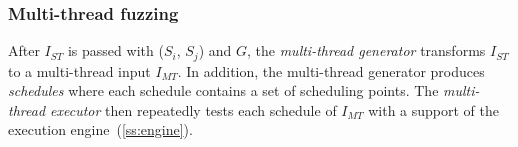 

\subsubsection{Multi-thread fuzzing}
\label{sss:multithreadfuzzing}
%
After $I_{ST}$ is passed with ($S_i$, $S_j$) and $G$, the
\textit{multi-thread generator} transforms $I_{ST}$ to a multi-thread
input $I_{MT}$.
%
In addition, the multi-thread generator produces \textit{schedules}
where each schedule contains a set of scheduling points.
%
The \textit{multi-thread executor} then repeatedly tests each schedule
of $I_{MT}$ with a support of the execution
engine~(\autoref{ss:engine}).










